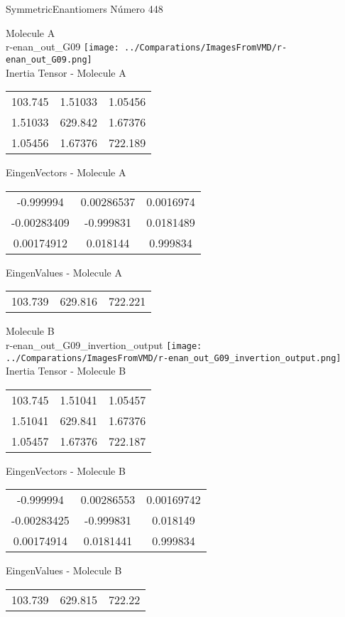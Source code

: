\vtab[-2cm]
\begin{center}
{\large SymmetricEnantiomers \tab Número 448}
\end{center}
\begin{multicols}{2}
\begin{center}

Molecule A \\ 
r-enan\_out\_G09
\texttt{[image: ../Comparations/ImagesFromVMD/r-enan\_out\_G09.png]}
\\
Inertia Tensor - Molecule A \\
\vtab

\begin{tabular}{|c c c|}
103.745	 & 	1.51033	 & 	1.05456	 \\
1.51033	 & 	629.842	 & 	1.67376	 \\
1.05456	 & 	1.67376	 & 	722.189
\end{tabular}

\vtab
 EingenVectors - Molecule A     \\
\vtab
\begin{tabular}{|c c c|}
-0.999994	 & 	0.00286537	 & 	0.0016974	 \\
-0.00283409	 & 	-0.999831	 & 	0.0181489	 \\
0.00174912	 & 	0.018144	 & 	0.999834
\end{tabular}

\vtab
 EingenValues - Molecule A     \\
\vtab
\begin{tabular}{|c c c|}
103.739	 & 	629.816	 & 	722.221	 \\
\end{tabular}
\columnbreak

Molecule B \\ 
r-enan\_out\_G09\_invertion\_output
\texttt{[image: ../Comparations/ImagesFromVMD/r-enan\_out\_G09\_invertion\_output.png]}
\\
Inertia Tensor - Molecule B \\
\vtab

\begin{tabular}{|c c c|}
103.745	 & 	1.51041	 & 	1.05457	 \\
1.51041	 & 	629.841	 & 	1.67376	 \\
1.05457	 & 	1.67376	 & 	722.187
\end{tabular}

\vtab
 EingenVectors - Molecule B     \\
\vtab
\begin{tabular}{|c c c|}
-0.999994	 & 	0.00286553	 & 	0.00169742	 \\
-0.00283425	 & 	-0.999831	 & 	0.018149	 \\
0.00174914	 & 	0.0181441	 & 	0.999834
\end{tabular}

\vtab
 EingenValues - Molecule B     \\
\vtab
\begin{tabular}{|c c c|}
103.739	 & 	629.815	 & 	722.22	 \\
\end{tabular}

\end{center}
\end{multicols}
